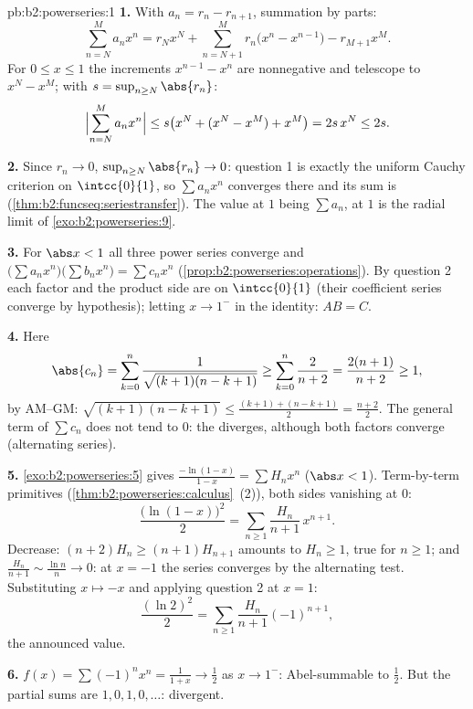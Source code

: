 \begin{solution}{pb:b2:powerseries:1}
\textbf{1.} With $a_n = r_n - r_{n+1}$, summation by parts:
\[
\sum_{n=N}^{M} a_nx^n
= r_Nx^N + \sum_{n=N+1}^{M} r_n\bigl(x^n - x^{n-1}\bigr)
- r_{M+1}x^M .
\]
For $0 \leq x \leq 1$ the increments $x^{n-1} - x^n$ are
nonnegative and telescope to $x^N - x^M$; with $s = \sup_{n\geq
N}\abs{r_n}$:
\[
\Bigl|\sum_{n=N}^{M}a_nx^n\Bigr|
\leq s\bigl(x^N + (x^N - x^M) + x^M\bigr) = 2s\,x^N \leq 2s .
\]

\textbf{2.} Since $r_n \to 0$, $\sup_{n\geq N}\abs{r_n} \to 0$:
question 1 is exactly the uniform Cauchy criterion on
$\intcc{0}{1}$, so $\sum a_nx^n$ converges  there and
its sum is  (\cref{thm:b2:funcseq:seriestransfer}).
The value at $1$ being $\sum a_n$,  at $1$ is the
radial limit of \cref{exo:b2:powerseries:9}.

\textbf{3.} For $\abs x < 1$ all three power series converge
 and $\bigl(\sum a_nx^n\bigr)\bigl(\sum b_nx^n\bigr)
= \sum c_nx^n$ (\cref{prop:b2:powerseries:operations}). By
question 2 each factor and the product side are  on
$\intcc{0}{1}$ (their coefficient series converge by
hypothesis); letting $x \to 1^-$ in the identity: $AB = C$.

\textbf{4.} Here
\[
\abs{c_n} = \sum_{k=0}^{n}
\frac{1}{\sqrt{(k+1)(n-k+1)}}
\geq \sum_{k=0}^{n}\frac{2}{n+2}
= \frac{2(n+1)}{n+2} \geq 1,
\]
by AM--GM: $\sqrt{(k+1)(n-k+1)} \leq \frac{(k+1) +
(n-k+1)}{2} = \frac{n+2}{2}$. The general term of $\sum c_n$
does not tend to $0$: the  diverges, although
both factors converge (alternating series).

\textbf{5.} \cref{exo:b2:powerseries:5} gives
$\frac{-\ln(1-x)}{1-x} = \sum H_nx^n$ ($\abs x < 1$).
Term-by-term primitives
(\cref{thm:b2:powerseries:calculus}~(2)), both sides vanishing
at $0$:
\[
\frac{\bigl(\ln(1-x)\bigr)^2}{2}
= \sum_{n\geq1}\frac{H_n}{n+1}\,x^{n+1} .
\]
Decrease: $(n+2)H_n \geq (n+1)H_{n+1}$ amounts to $H_n \geq
1$, true for $n \geq 1$; and $\frac{H_n}{n+1} \sim \frac{\ln
n}{n} \to 0$: at $x = -1$ the series converges by the
alternating test. Substituting $x \mapsto -x$ and applying
question 2 at $x = 1$:
\[
\frac{(\ln 2)^2}{2}
= \sum_{n\geq1}\frac{H_n}{n+1}(-1)^{n+1},
\]
the announced value.

\textbf{6.} $f(x) = \sum(-1)^nx^n = \frac{1}{1+x} \to \frac12$
as $x \to 1^-$: Abel-summable to $\frac12$. But the partial
sums are $1, 0, 1, 0, \dots$: divergent.


\end{solution}
